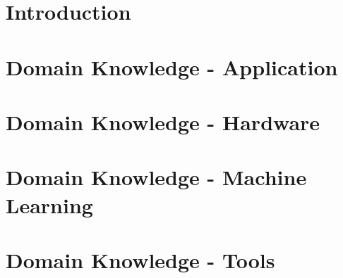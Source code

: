 \documentclass[10pt,a4paper,b ibliography=totoc]{scrbook}
\begin{document}
    
   

\tableofcontents
\newpage

\listoffigures
\newpage

\lstlistoflistings

%


\part{Introduction}


\part{Domain Knowledge - Application}  


\part{Domain Knowledge - Hardware}  
  
  
  
  
  
  
  
  

\part{Domain Knowledge - Machine Learning}






\part{Domain Knowledge - Tools}  


\end{document}
